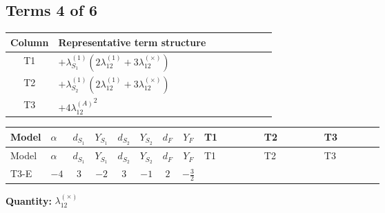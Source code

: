 \documentclass[8pt]{article}
\begin{document}
\begin{landscape}
\subsection*{Terms 4 of 6}
\begin{center}
\begin{tabular}{@{}c >{\raggedright\arraybackslash}p{0.82\linewidth}@{}}
\toprule
Column & Representative term structure \\
\midrule
T1 & \(\displaystyle +{\lambda_{S_1}^{(1)}} (2 {\lambda_{12}^{(1)}}+3 {\lambda_{12}^{(\times)}})\) \\
\midrule
T2 & \(\displaystyle +{\lambda_{S_2}^{(1)}} (2 {\lambda_{12}^{(1)}}+3 {\lambda_{12}^{(\times)}})\) \\
\midrule
T3 & \(\displaystyle +4 {\lambda_{12}^{(A)}}^2\) \\
\midrule
\bottomrule
\end{tabular}
\end{center}
\smallskip
\tiny
\begin{longtable}{@{}llcccccc >{\raggedright\arraybackslash}p{0.21\linewidth} >{\raggedright\arraybackslash}p{0.21\linewidth} >{\raggedright\arraybackslash}p{0.21\linewidth}@{}}
\toprule
Model & $\alpha$ & $d_{S_1}$ & $Y_{S_1}$ & $d_{S_2}$ & $Y_{S_2}$ & $d_F$ & $Y_F$ & T1 & T2 & T3 \\
\midrule
\endfirsthead
\toprule
Model & $\alpha$ & $d_{S_1}$ & $Y_{S_1}$ & $d_{S_2}$ & $Y_{S_2}$ & $d_F$ & $Y_F$ & T1 & T2 & T3 \\
\midrule
\endhead
T3-E & $-4$ & $3$ & $-2$ & $3$ & $-1$ & $2$ & $-\frac{3}{2}$ & \scriptsize\adjustbox{max width=\linewidth}{$\begin{gathered} +{\lambda_{S_1}^{(1)}} (2 {\lambda_{12}^{(1)}}+3 {\lambda_{12}^{(\times)}})\end{gathered}$} & \scriptsize\adjustbox{max width=\linewidth}{$\begin{gathered} +{\lambda_{S_2}^{(1)}} (2 {\lambda_{12}^{(1)}}+3 {\lambda_{12}^{(\times)}})\end{gathered}$} & \scriptsize\adjustbox{max width=\linewidth}{$\begin{gathered} +4 {\lambda_{12}^{(A)}}^2\end{gathered}$} \\
\midrule
\bottomrule
\end{longtable}
\clearpage
\noindent\textbf{Quantity: }$\lambda_{12}^{(\times)}$\par\smallskip

\end{landscape}
\end{document}

